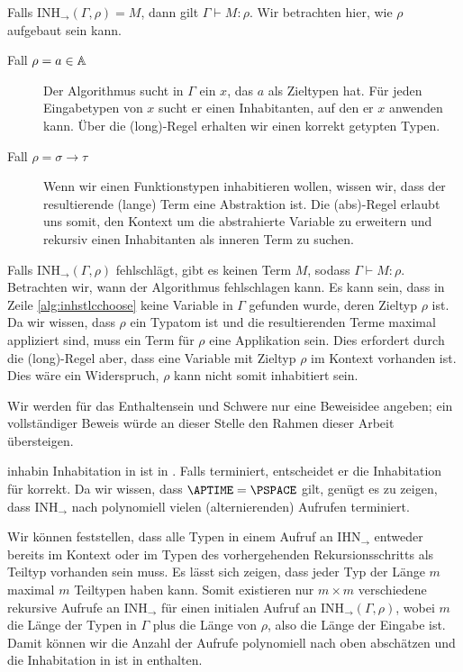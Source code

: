 \begin{theorem}{}{}
    Falls INH$_\to(\Gamma, \rho)=M$, dann gilt $\Gamma\vdash M : \rho$.
    \Proofidea Wir betrachten hier, wie $\rho$ aufgebaut sein kann.
    \begin{description}
        \item[Fall $\rho = a\in\mathbb{A}$] Der Algorithmus sucht in $\Gamma$ ein $x$, das $a$ als Zieltypen hat. Für jeden Eingabetypen von $x$ sucht er einen Inhabitanten, auf den er $x$ anwenden kann. Über die (long)-Regel erhalten wir einen korrekt getypten Typen.
        \item[Fall $\rho = \sigma\to\tau$] Wenn wir einen Funktionstypen inhabitieren wollen, wissen wir, dass der resultierende (lange) Term eine Abstraktion ist. Die (abs)-Regel erlaubt uns somit, den Kontext um die abstrahierte Variable zu erweitern und rekursiv einen Inhabitanten als inneren Term zu suchen.
    \end{description}
\end{theorem}

\begin{theorem}{}{}
    Falls INH$_\to(\Gamma, \rho)$ fehlschlägt, gibt es keinen Term $M$, sodass $\Gamma\vdash M:\rho$.
    \Proof Betrachten wir, wann der Algorithmus fehlschlagen kann. Es kann sein, dass in Zeile \ref{alg:inhstlcchoose} keine Variable in $\Gamma$ gefunden wurde, deren Zieltyp $\rho$ ist. Da wir wissen, dass $\rho$ ein Typatom ist und die resultierenden Terme maximal appliziert sind, muss ein Term für $\rho$ eine Applikation sein. Dies erfordert durch die (long)-Regel aber, dass eine Variable mit Zieltyp $\rho$ im Kontext vorhanden ist. Dies wäre ein Widerspruch, $\rho$ kann nicht somit inhabitiert sein.      
\end{theorem}

Wir werden für das Enthaltensein und Schwere nur eine Beweisidee angeben; ein vollständiger Beweis würde an dieser Stelle den Rahmen dieser Arbeit übersteigen.

\begin{theorem}{}{inhabin}
    Inhabitation in \STLC{} ist in \PSPACE.
        \Proofidea
    Falls  terminiert, entscheidet er die Inhabitation für \STLC{} korrekt. Da wir wissen, dass $\APTIME=\PSPACE$ gilt\cite{chandra81}, genügt es zu zeigen, dass INH$_\to$ nach polynomiell vielen (alternierenden) Aufrufen terminiert.  
    
    Wir können feststellen, dass alle Typen in einem Aufruf an IHN$_\to$ entweder bereits im Kontext oder im Typen des vorhergehenden Rekursionsschritts als Teiltyp vorhanden sein muss. Es lässt sich zeigen, dass jeder Typ der Länge $m$ maximal $m$ Teiltypen haben kann. Somit existieren nur $m \times m$ verschiedene rekursive Aufrufe an INH$_\to$ für einen initialen Aufruf an INH$_\to(\Gamma, \rho)$, wobei $m$ die Länge der Typen in $\Gamma$ plus die Länge von $\rho$, also die Länge der Eingabe ist. Damit können wir die Anzahl der Aufrufe polynomiell nach oben abschätzen und die Inhabitation in \STLC{} ist in \PSPACE{} enthalten. 
\end{theorem}


